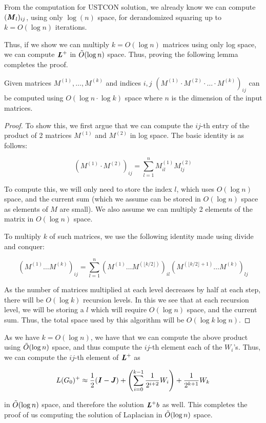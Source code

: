 \documentclass{article}
\begin{document}
From the computation for USTCON solution, we already know we can compute $(\boldsymbol{\mathit{M}}_l)_{ij}$, using only $\log(n)$ space, for derandomized squaring up to $k=O(\log n)$ iterations.

Thus, if we show we can multiply $k=O(\log n)$ matrices using only log space, we can compute $\boldsymbol{\mathit{L}}^+$ in $\Tilde{O}(\log n)$ space. Thus, proving the following lemma completes the proof.

\begin{lemma}
    Given matrices $M^{(1)},\ldots, M^{(k)}$ and indices $i,j$ $(M^{(1)}\cdot M^{(2)}\cdot\ldots \cdot M^{(k)})_{ij}$ can be computed
using $O(\log n \cdot \log k)$ space where $n$ is the dimension of the input matrices.
\end{lemma}
\begin{proof}
    To show this, we first argue that we can compute the $ij$-th entry of the product of 2 matrices $M^{(1)}$ and $M^{(2)}$ in log space. The basic identity is as follows:
    
    $$(M^{(1)}\cdot M^{(2)})_{ij}=\sum_{l=1}^n M^{(1)}_{il}M^{(2)}_{lj}$$

    To compute this, we will only need to store the index $l$, which uses $O(\log n)$ space, and the current sum (which we assume can be stored in $O(\log n)$ space as elements of $M$ are small). We also assume we can multiply 2 elements of the matrix in $O(\log n)$ space.

    To multiply $k$ of such matrices, we use the following identity made using divide and conquer:

    $$(M^{(1)}\ldots M^{(k)})_{ij}=\sum_{l=1}^n (M^{(1)} \ldots M^{(\lfloor k/2\rfloor)})_{il}(M^{(\lfloor k/2\rfloor+1)}\ldots M^{(k)})_{lj}$$

    As the number of matrices multiplied at each level decreases by half at each step, there will be $O(\log k)$ recursion levels. In this we see that at each recursion level, we will be storing a $l$ which will require $O(\log n)$ space, and the current sum. Thus, the total space used by this algorithm will be $O(\log k\log n)$.
\end{proof}

    As we have $k=O(\log n)$, we have that we can compute the above product using $\Tilde{O}(\log n)$ space, and thus compute the $ij$-th element each of the $W_i$'s. Thus, we can compute the $ij$-th element of $\boldsymbol{\mathit{L}}^+$ as

    $$L(G_0)^+\approx\frac{1}{2}(\boldsymbol{\mathit{I}}-\boldsymbol{\mathit{J}})+\left(\sum_{i=0}^{k-1}\frac{1}{2^{i+2}}W_i\right)+\frac{1}{2^{k+1}}W_k$$

    in $\Tilde{O}(\log n)$ space, and therefore the solution $\boldsymbol{\mathit{L}}^+ b$ as well. This completes the proof of us computing the solution of Laplacian in $\Tilde{O}(\log n)$ space.

\renewcommand*{\bibfont}{\raggedright}
\newpage
\printbibliography
\end{document}
